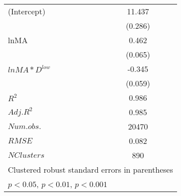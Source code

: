 \begin{table}[H]
\begin{minipage}[t]{0.45\columnwidth}
\begin{center}
{\begin{tabular}{l*{4}{c}}
\hline
(Intercept)    &       &      &       11.437\sym{***}&       \\
               &       &      &        (0.286)       &        \\
[1em]
 lnMA            &      &       &      0.462\sym{***} &          \\
               &      &       &     (0.065)         &           \\
[1em]
\(lnMA*D^{low}\)     &      &      &      -0.345\sym{***} &          \\
               &      &       &     (0.059)         &           \\
[1em]
\hline
\(R^{2}\)      &      &       &        0.986        &          \\
\(Adj.R^{2}\)  &      &       &       0.985         &         \\
\(Num.obs.\)   &      &       &    20470            &          \\
\(RMSE\)       &      &       &    0.082            &          \\
\(N Clusters\) &      &       &    890              &          \\
\hline\hline
\multicolumn{5}{l}{\footnotesize Clustered robust standard errors in parentheses}\\
\multicolumn{5}{l}{\footnotesize \sym{*} \(p<0.05\), \sym{**} \(p<0.01\), \sym{***} \(p<0.001\)}\\
\end{tabular}
}
  \end{center}
  \end{minipage}
  \end{table}
  

